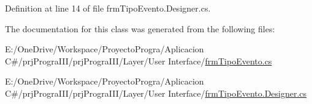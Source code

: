 Definition at line 14 of file frm\+Tipo\+Evento.\+Designer.\+cs.



The documentation for this class was generated from the following files\+:\begin{DoxyCompactItemize}
\item 
E\+:/\+One\+Drive/\+Workspace/\+Proyecto\+Progra/\+Aplicacion C\#/prj\+Progra\+I\+I\+I/prj\+Progra\+I\+I\+I/\+Layer/\+User Interface/\hyperlink{frm_tipo_evento_8cs}{frm\+Tipo\+Evento.\+cs}\item 
E\+:/\+One\+Drive/\+Workspace/\+Proyecto\+Progra/\+Aplicacion C\#/prj\+Progra\+I\+I\+I/prj\+Progra\+I\+I\+I/\+Layer/\+User Interface/\hyperlink{frm_tipo_evento_8_designer_8cs}{frm\+Tipo\+Evento.\+Designer.\+cs}\end{DoxyCompactItemize}
